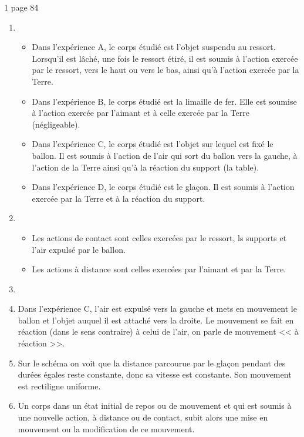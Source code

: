 \begin{myact}{1 page 84}
	\begin{enumerate}
		\item \begin{itemize}
			\item Dans l'expérience A, le corps étudié est l'objet suspendu au ressort. Lorsqu'il est lâché, une fois le ressort étiré, il est soumis à l'action exercée par le ressort, vers le haut ou vers le bas, ainsi qu'à l'action exercée par la Terre.
			\item Dans l'expérience B, le corps étudié est la limaille de fer. Elle est soumise à l'action exercée par l'aimant et à celle exercée par la Terre (négligeable).
			\item Dans l'expérience C, le corps étudié est l'objet sur lequel est fixé le ballon. Il est soumis à l'action de l'air qui sort du ballon vers la gauche, à l'action de la Terre ainsi qu'à la réaction du support (la table).
			\item Dans l'expérience D, le corps étudié est le glaçon. Il est soumis à l'action exercée par la Terre et à la réaction du support.
		\end{itemize}
		
		\item \begin{itemize}
			\item Les actions de contact sont celles exercées par le ressort, ls supports et l'air expulsé par le ballon.
			\item Les actions à distance sont celles exercées par l'aimant et par la Terre. 
		\end{itemize}
		
		\item 
		
		\item Dans l'expérience C, l'air est expulsé vers la gauche et mets en mouvement le ballon et l'objet auquel il est attaché vers la droite. Le mouvement se fait en réaction (dans le sens contraire) à celui de l'air, on parle de mouvement << à réaction >>.
		
		\item Sur le schéma on voit que la distance parcourue par le glaçon pendant des durées égales reste constante, donc sa vitesse est constante. Son mouvement est rectiligne uniforme.
		
		\item Un corps dans un état initial de repos ou de mouvement et qui est soumis à une nouvelle action, à distance ou de contact, subit alors une mise en mouvement ou la modification de ce mouvement.
	\end{enumerate}
\end{myact}